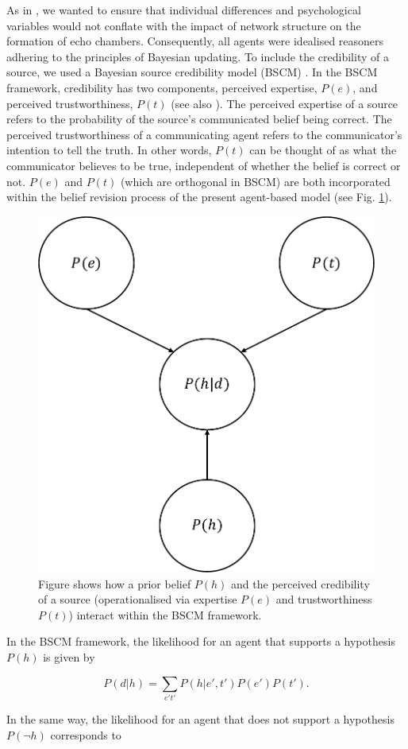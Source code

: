 \documentclass[fleqn,10pt]{wlscirep}
\begin{document}
As in \cite{madsen2017growing, madsen2018large}, we wanted to ensure that individual differences and psychological variables would not conflate with the impact of network structure on the formation of echo chambers. Consequently, all agents were idealised reasoners adhering to the principles of Bayesian updating. To include the credibility of a source, we used a Bayesian source credibility model (BSCM) \cite{bovens2003bayesian, hahn2009argument, harris2009bayesian}. In the BSCM framework, credibility has two components, perceived expertise, \(P(e)\), and perceived trustworthiness, \(P(t)\) (see also \cite{harris2016appeal}). The perceived expertise of a source refers to the probability of the source's communicated belief being correct. The perceived trustworthiness of a communicating agent refers to the communicator's intention to tell the truth. In other words, \(P(t)\) can be thought of as what the communicator believes to be true, independent of whether the belief is correct or not. \(P(e)\) and \(P(t)\) (which are orthogonal in BSCM) are both incorporated within the belief revision process of the present agent-based model (see Fig. \ref{fig:bscm}).

\begin{figure}[ht]
\centering
\includegraphics[width=0.4\columnwidth]{img/bscm_pdf.pdf}
\caption{Figure shows how a prior belief \(P(h)\) and the perceived credibility of a source (operationalised via expertise \(P(e)\) and trustworthiness \(P(t)\)) interact within the BSCM framework.}
\label{fig:bscm}
\label{fig:bscm}
\end{figure}

In the BSCM framework, the likelihood for an agent that supports a hypothesis  \(P(h)\) is given by

\begin{equation}
    P(d|h) = \sum_{e't'}P(h|e',t')P(e')P(t'). 
\end{equation}

In the same way, the likelihood for an agent that does not support a hypothesis \(P(\neg h)\) corresponds to
   
\end{document}
